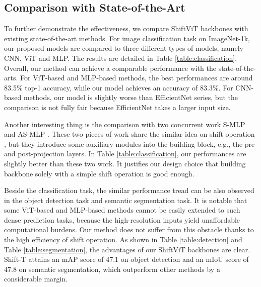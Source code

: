 \documentclass[letterpaper]{article} \usepackage{aaai22}  \usepackage{times}  \usepackage{helvet}  \usepackage{courier}  \usepackage[hyphens]{url}  \usepackage{graphicx} \usepackage{amsmath}
\begin{document}
\subsection{Comparison with State-of-the-Art}

To further demonstrate the effectiveness, we compare ShiftViT backbones with existing state-of-the-art methods. For image classification task on ImageNet-1k, our proposed models are compared to three different types of models, namely CNN, ViT and MLP. The results are detailed in Table \ref{table:classification}. Overall, our method can achieve a comparable performance with the state-of-the-arts. For ViT-based and MLP-based methods, the best performances are around 83.5\% top-1 accuracy, while our model achieves an accuracy of 83.3\%. For CNN-based methods, our model is slightly worse than EfficientNet series, but the comparison is not fully fair because EfficientNet takes a larger input size. 

Another interesting thing is the comparison with two concurrent work S-MLP \cite{ShiftMLP} and AS-MLP \cite{ASMLP}. These two pieces of work share the similar idea on shift operation , but they introduce some auxiliary modules into the building block, e.g., the pre- and post-projection layers. In Table \ref{table:classification}, our performances are slightly better than these two work. It justifies our design choice that building backbone solely with a simple shift operation is good enough.

Beside the classification task, the similar performance tread can be also observed in the object detection task and semantic segmentation task. It is notable that some ViT-based and MLP-based methods cannot be easily extended to such dense prediction tasks, because the high-resolution inputs yield unaffordable computational burdens. Our method does not suffer from this obstacle thanks to the high efficiency of shift operation. As shown in Table \ref{table:detection} and Table \ref{table:segmentation}, the advantages of our ShiftViT backbones are clear. Shift-T attains an mAP score of 47.1 on object detection and an mIoU score of 47.8 on semantic segmentation, which outperform other methods by a considerable margin. 
\end{document}
